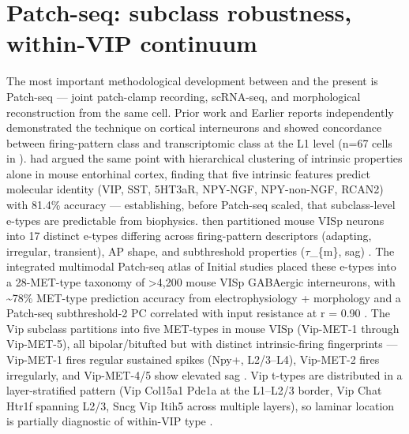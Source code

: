 \documentclass[11pt]{article}
\begin{document}
\section{Patch-seq: subclass robustness, within-VIP continuum}\label{sec-05-patchseq}

The most important methodological development between \citet{Cauli1997} and the present is Patch-seq --- joint patch-clamp recording, scRNA-seq, and morphological reconstruction from the same cell. Prior work and Earlier reports \citep{Fuzik2016} independently demonstrated the technique on cortical interneurons and showed concordance between firing-pattern class and transcriptomic class at the L1 level (n=67 cells in \citet{Cadwell2016}). \citet{Ferrante2016} had argued the same point with hierarchical clustering of intrinsic properties alone in mouse entorhinal cortex, finding that five intrinsic features predict molecular identity (VIP, SST, 5HT3aR, NPY-NGF, NPY-non-NGF, RCAN2) with 81.4\% accuracy \citep{Ferrante2016} --- establishing, before Patch-seq scaled, that subclass-level e-types are predictable from biophysics. \citet{Gouwens2019} then partitioned mouse VISp neurons into 17 distinct e-types differing across firing-pattern descriptors (adapting, irregular, transient), AP shape, and subthreshold properties ($\tau$\_\{m\}, sag) \citep{Gouwens2019}. The integrated multimodal Patch-seq atlas of Initial studies placed these e-types into a 28-MET-type taxonomy of \textgreater 4,200 mouse VISp GABAergic interneurons, with {\textasciitilde}78\% MET-type prediction accuracy from electrophysiology + morphology and a Patch-seq subthreshold-2 PC correlated with input resistance at r = 0.90 \citep{Gouwens2020a}. The Vip subclass partitions into five MET-types in mouse VISp (Vip-MET-1 through Vip-MET-5), all bipolar/bitufted but with distinct intrinsic-firing fingerprints --- Vip-MET-1 fires regular sustained spikes (Npy+, L2/3--L4), Vip-MET-2 fires irregularly, and Vip-MET-4/5 show elevated sag \citep{Gouwens2020a}. Vip t-types are distributed in a layer-stratified pattern (Vip Col15a1 Pde1a at the L1--L2/3 border, Vip Chat Htr1f spanning L2/3, Sncg Vip Itih5 across multiple layers), so laminar location is partially diagnostic of within-VIP type \citep{Gouwens2020a, Tasic2018, Tasic2016, Yao2021a}.
\end{document}
